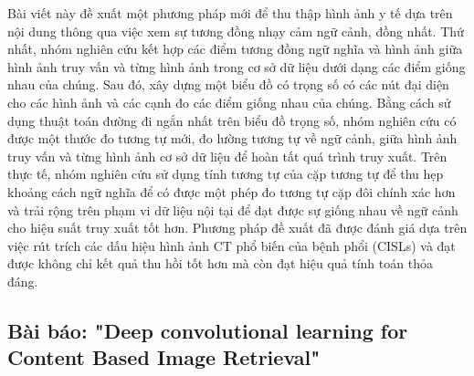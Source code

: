 \documentclass[a4paper,14pt]{extreport}
\begin{document}
Bài viết này đề xuất một phương pháp mới để thu thập hình ảnh y tế dựa trên nội dung thông qua việc xem sự tương đồng nhạy cảm ngữ cảnh, đồng nhất. Thứ nhất, nhóm nghiên cứu kết hợp các điểm tương đồng ngữ nghĩa và hình ảnh giữa hình ảnh truy vấn và từng hình ảnh trong cơ sở dữ liệu dưới dạng các điểm giống nhau của chúng. Sau đó, xây dựng một biểu đồ có trọng số có các nút đại diện cho các hình ảnh và các cạnh đo các điểm giống nhau của chúng. Bằng cách sử dụng thuật toán đường đi ngắn nhất trên biểu đồ trọng số, nhóm nghiên cứu có được một thước đo tương tự mới, đo lường tương tự về ngữ cảnh, giữa hình ảnh truy vấn và từng hình ảnh cơ sở dữ liệu để hoàn tất quá trình truy xuất. Trên thực tế, nhóm nghiên cứu sử dụng tính tương tự của cặp tương tự để thu hẹp khoảng cách ngữ nghĩa để có được một phép đo tương tự cặp đôi chính xác hơn và trải rộng trên phạm vi dữ liệu nội tại để đạt được sự giống nhau về ngữ cảnh cho hiệu suất truy xuất tốt hơn. Phương pháp đề xuất đã được đánh giá dựa trên việc rút trích các dấu hiệu hình ảnh CT phổ biến của bệnh phổi (CISLs) và đạt được không chỉ kết quả thu hồi tốt hơn mà còn đạt hiệu quả tính toán thỏa đáng.


\subsection{Bài báo: "Deep convolutional learning for Content Based Image Retrieval" \cite{paper-4}}
\end{document}
